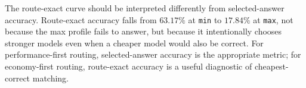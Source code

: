 The route-exact curve should be interpreted differently from selected-answer
accuracy. Route-exact accuracy falls from \(63.17\%\) at \texttt{min} to
\(17.84\%\) at \texttt{max}, not because the max profile fails to answer, but
because it intentionally chooses stronger models even when a cheaper model would
also be correct. For performance-first routing, selected-answer accuracy is the
appropriate metric; for economy-first routing, route-exact accuracy is a useful
diagnostic of cheapest-correct matching.
